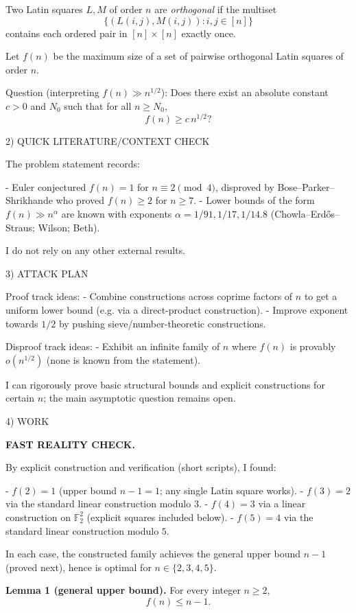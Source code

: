 Two Latin squares $L,M$ of order $n$ are \emph{orthogonal} if the multiset
\[
\{(L(i,j),M(i,j)) : i,j\in[n]\}
\]
contains each ordered pair in $[n]\times[n]$ exactly once.

Let $f(n)$ be the maximum size of a set of pairwise orthogonal Latin squares of order $n$.

Question (interpreting $f(n)\gg n^{1/2}$): Does there exist an absolute constant $c>0$ and $N_0$ such that for all $n\ge N_0$,
\[
 f(n) \ge c\, n^{1/2}?
\]

2) QUICK LITERATURE/CONTEXT CHECK

The problem statement records:

- Euler conjectured $f(n)=1$ for $n\equiv 2\pmod 4$, disproved by Bose--Parker--Shrikhande who proved $f(n)\ge 2$ for $n\ge 7$.
- Lower bounds of the form $f(n)\gg n^\alpha$ are known with exponents $\alpha=1/91,1/17,1/14.8$ (Chowla--Erd\H{o}s--Straus; Wilson; Beth).

I do not rely on any other external results.

3) ATTACK PLAN

Proof track ideas:
- Combine constructions across coprime factors of $n$ to get a uniform lower bound (e.g. via a direct-product construction).
- Improve exponent towards $1/2$ by pushing sieve/number-theoretic constructions.

Disproof track ideas:
- Exhibit an infinite family of $n$ where $f(n)$ is provably $o(n^{1/2})$ (none is known from the statement).

I can rigorously prove basic structural bounds and explicit constructions for certain $n$; the main asymptotic question remains open.

4) WORK

\textbf{FAST REALITY CHECK.}

By explicit construction and verification (short scripts), I found:

- $f(2)=1$ (upper bound $n-1=1$; any single Latin square works).
- $f(3)=2$ via the standard linear construction modulo $3$.
- $f(4)=3$ via a linear construction on $\mathbb F_2^2$ (explicit squares included below).
- $f(5)=4$ via the standard linear construction modulo $5$.

In each case, the constructed family achieves the general upper bound $n-1$ (proved next), hence is optimal for $n\in\{2,3,4,5\}$.

\medskip

\textbf{Lemma 1 (general upper bound).}
For every integer $n\ge 2$,
\[
 f(n) \le n-1.
\]

